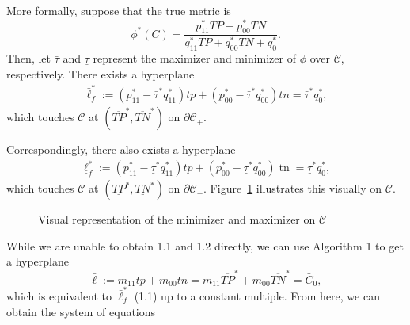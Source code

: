 \documentclass[
  letterpaper,
  numbers=noenddot,
  DIV=11,
  oneside]{scrreprt}
\theoremstyle{remark}
\begin{document}
More formally, suppose that the true metric is
\[\phi^{*}(C)=\frac{p_{11}^{*} T P+p_{00}^{*} T N}{q_{11}^{*} T P+q_{00}^{*} T N+q_{0}^{*}}.\]
Then, let \(\bar{\tau}\) and \(\underline{\tau}\) represent the
maximizer and minimizer of \(\phi\) over \(\mathcal{C}\), respectively.
There exists a hyperplane \[\begin{aligned}
\bar{\ell}_{f}^{*}:=\left(p_{11}^{*}-\bar{\tau}^{*} q_{11}^{*}\right) t p+\left(p_{00}^{*}-\bar{\tau}^{*} q_{00}^{*}\right) t n=\bar{\tau}^{*} q_{0}^{*},
\end{aligned}\] which touches \(\mathcal{C}\) at
\(\left(\overline{T P}^{*}, \overline{T N}^{*}\right)\) on
\(\partial \mathcal{C}_{+}\).

Correspondingly, there also exists a hyperplane \[\begin{aligned}
\underline{\ell}_{f}^{*}:=\left(p_{11}^{*}-\underline{\tau}^{*} q_{11}^{*}\right) t p+\left(p_{00}^{*}-\underline{\tau}^{*} q_{00}^{*}\right) \operatorname{tn}=\underline{\tau}^{*} q_{0}^{*},
\end{aligned}\] which touches \(\mathcal{C}\) at
\(\left(\underline{TP}^{*}, \underline{T N}^{*}\right)\) on
\(\partial \mathcal{C}_{-}\). Figure~\ref{fig-minmax} illustrates this
visually on \(\mathcal{C}\).

\begin{figure}


\caption{\label{fig-minmax}Visual representation of the minimizer and
maximizer on \(\mathcal{C}\)}

\end{figure}%

While we are unable to obtain 1.1 and 1.2 directly, we can use Algorithm
1 to get a hyperplane
\[\bar{\ell}:=\bar{m}_{11} t p+\bar{m}_{00} t n= \bar{m}_{11} \overline{T P}^{*}+\bar{m}_{00} \overline{T N}^{*} = \bar{C}_{0},\]
which is equivalent to \(\bar{\ell}_{f}^{*}\) (1.1) up to a constant
multiple. From here, we can obtain the system of equations
\end{document}

